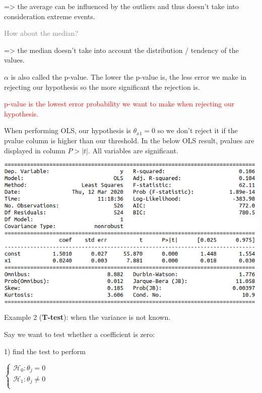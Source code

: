 => the average can be influenced by the outliers and thus doesn't take into consideration extreme events.

\vspace{5mm}

\textcolor{gray}{How about the median?}

=> the median doesn't take into account the distribution / tendency of the values.

\vspace{5mm}

$\alpha$ is also called the p-value. The lower the p-value is, the less error we make in rejecting our hypothesis so the more significant the rejection is.

\textcolor{red}{p-value is the lowest error probability we want to make when rejecting our hypothesis.}

\vspace{5mm}

When performing OLS, our hypothesis is $\theta_{x1}=0$ so we don't reject it if the pvalue column is higher than our threshold. In the below OLS result, pvalues are displayed in column $P>|t|$. All variables are significant.

\begin{center}
\includegraphics[scale=0.5]{OLS_pvalue.png}
\end{center}

Example 2 (\textbf{T-test}):  when the variance is not known.

\vspace{5mm}

Say we want to test whether a coefficient is zero:

1) find the test to perform

\vspace{5mm}

$
\left\{
    \begin{array}{ll}
        \mathcal{H}_0: \theta_j=0 \\
        \mathcal{H}_1: \theta_j \neq 0 \\
    \end{array}
\right.
$

